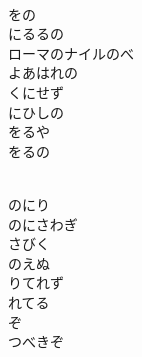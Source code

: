 \documentclass[10pt,b5j]{tarticle} %
\begin{document}
\vspace{1.5em} %
\newcommand{\linespace}{0.5em} %
\newcommand{\blocksize}{0.5\hsize} %
\newcommand{\itemmargin}{6em} %
\begin{enumerate} %
    \setlength{\itemindent}{\itemmargin} %
    \begin{minipage}[c]{\blocksize}
    
        \vspace{\linespace}
        \item~\\
        をの\\
        にるるの\\
        ローマのナイルのべ\\
        よあはれの\\
        くにせず\\
        にひしの\\
        をるや\\
        をるの
        
        \vspace{\linespace}
        \item~\\
        のにり　\\
        のにさわぎ\\
        さびく　\\
        のえぬ\\
        りてれず\\
        れてる\\
        ぞ\\
        つべきぞ
        

\end{minipage}
\end{enumerate}
\end{document}
